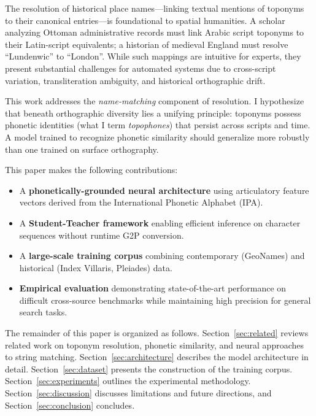\documentclass[11pt]{article}
\begin{document}
    The resolution of historical place names---linking textual mentions of toponyms to their canonical entries---is foundational to spatial humanities. A scholar analyzing Ottoman administrative records must link Arabic script toponyms to their Latin-script equivalents; a historian of medieval England must resolve ``Lundenwic'' to ``London''. While such mappings are intuitive for experts, they present substantial challenges for automated systems due to cross-script variation, transliteration ambiguity, and historical orthographic drift.

    This work addresses the \emph{name-matching} component of resolution. I hypothesize that beneath orthographic diversity lies a unifying principle: toponyms possess phonetic identities (what I term \emph{topophones}) that persist across scripts and time. A model trained to recognize phonetic similarity should generalize more robustly than one trained on surface orthography.

    This paper makes the following contributions:
    \begin{itemize}
        \item A \textbf{phonetically-grounded neural architecture} using articulatory feature vectors derived from the International Phonetic Alphabet (IPA).
        \item A \textbf{Student-Teacher framework} enabling efficient inference on character sequences without runtime G2P conversion.
        \item A \textbf{large-scale training corpus} combining contemporary (GeoNames) and historical (Index Villaris, Pleiades) data.
        \item \textbf{Empirical evaluation} demonstrating state-of-the-art performance on difficult cross-source benchmarks while maintaining high precision for general search tasks.
    \end{itemize}

    The remainder of this paper is organized as follows. Section~\ref{sec:related} reviews related work on toponym resolution, phonetic similarity, and neural approaches to string matching. Section~\ref{sec:architecture} describes the model architecture in detail. Section~\ref{sec:dataset} presents the construction of the training corpus. Section~\ref{sec:experiments} outlines the experimental methodology.
    Section~\ref{sec:discussion} discusses limitations and future directions, and Section~\ref{sec:conclusion} concludes.
\end{document}
